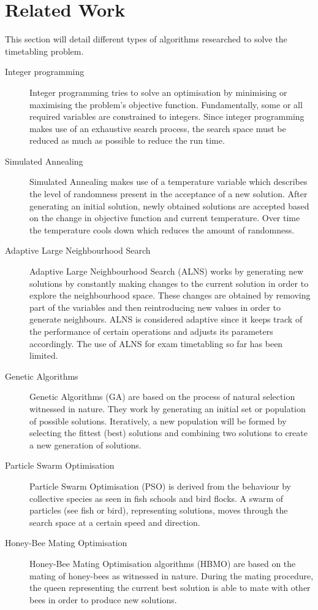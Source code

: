 
\section{Related Work}\label{sec:related-work}

This section will detail different types of algorithms researched to solve the timetabling problem.

\begin{description}
    \item [Integer programming] Integer programming tries to solve an optimisation by minimising or maximising the problem's objective function. Fundamentally, some or all required variables are constrained to integers. Since integer programming makes use of an exhaustive search process, the search space must be reduced as much as possible to reduce the run time.
    \item [Simulated Annealing] Simulated Annealing\cite{kirkpatrick1983} makes use of a temperature variable which describes the level of randomness present in the acceptance of a new solution. After generating an initial solution, newly obtained solutions are accepted based on the change in objective function and current temperature. Over time the temperature cools down which reduces the amount of randomness.
    \item [Adaptive Large Neighbourhood Search] Adaptive Large Neighbourhood Search (ALNS) \cite{ropke2006} works by generating new solutions by constantly making changes to the current solution in order to explore the neighbourhood space. These changes are obtained by removing part of the variables and then reintroducing new values in order to generate neighbours. ALNS is considered adaptive since it keeps track of the performance of certain operations and adjusts its parameters accordingly. The use of ALNS for exam timetabling so far has been limited.
    \item [Genetic Algorithms] Genetic Algorithms (GA) \cite{Holland1975} are based on the process of natural selection witnessed in nature. They work by generating an initial set or population of possible solutions. Iteratively, a new population will be formed by selecting the fittest (best) solutions and combining two solutions to create a new generation of solutions.
    \item [Particle Swarm Optimisation] Particle Swarm Optimisation (PSO) \cite{kennedy1995} is derived from the behaviour by collective species as seen in fish schools and bird flocks. A swarm of particles (see fish or bird), representing solutions, moves through the search space at a certain speed and direction.
    \item [Honey-Bee Mating Optimisation] Honey-Bee Mating Optimisation algorithms (HBMO) \cite{abbas2001} are based on the mating of honey-bees as witnessed in nature. During the mating procedure, the queen representing the current best solution is able to mate with other bees in order to produce new solutions.


\end{description}

